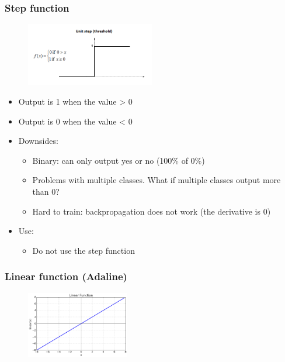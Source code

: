 \documentclass{article}
\begin{document}
\subsubsection{Step function}

\begin{figure}[H]
    \centering
    \includegraphics[width=0.5\textwidth]{step-function.png}
\end{figure}

\begin{itemize}
    \item Output is 1 when the value > 0
    \item Output is 0 when the value < 0
    \item Downsides:
    \begin{itemize}
        \item Binary: can only output yes or no (100\% of 0\%)
        \item Problems with multiple classes. What if multiple classes output more than 0?
        \item Hard to train: backpropagation does not work (the derivative is 0)
    \end{itemize}
    \item Use:
    \begin{itemize}
        \item Do not use the step function
    \end{itemize}
\end{itemize}


\subsubsection{Linear function (Adaline)}

\begin{figure}[H]
    \centering
    \includegraphics[width=0.4\textwidth]{adaline.png}
\end{figure}
\end{document}
